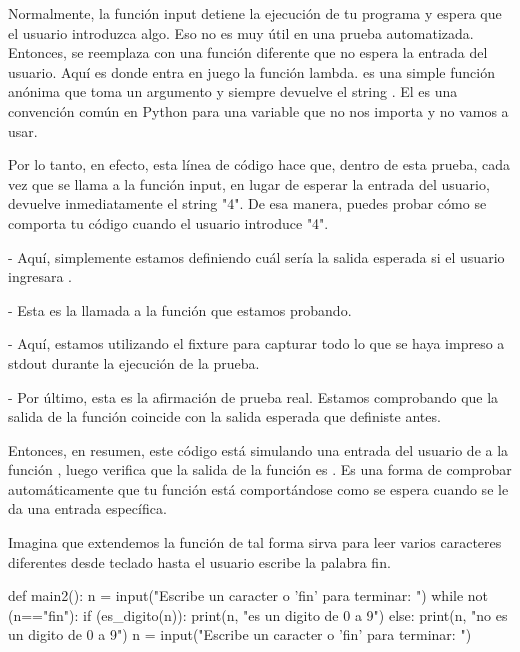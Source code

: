 Normalmente, la función input detiene la ejecución de tu programa y espera que el usuario introduzca algo. Eso no es muy útil en una prueba automatizada. Entonces, se reemplaza con una función diferente que no espera la entrada del usuario. Aquí es donde entra en juego la función lambda.  es una simple función anónima que toma un argumento \pythoninline{(_)} y siempre devuelve el string . El \pythoninline{_} es una convención común en Python para una variable que no nos importa y no vamos a usar.

Por lo tanto, en efecto, esta línea de código hace que, dentro de esta prueba, cada vez que se llama a la función input, en lugar de esperar la entrada del usuario, devuelve inmediatamente el string "4". De esa manera, puedes probar cómo se comporta tu código cuando el usuario introduce "4".

 - Aquí, simplemente estamos definiendo cuál sería la salida esperada si el usuario ingresara .

 - Esta es la llamada a la función que estamos probando.

 -  Aquí, estamos utilizando el fixture  para capturar todo lo que se haya impreso a stdout durante la ejecución de la prueba.

 - Por último, esta es la afirmación de prueba real. Estamos comprobando que la salida de la función  coincide con la salida esperada que definiste antes.

Entonces, en resumen, este código está simulando una entrada del usuario de  a la función , luego verifica que la salida de la función es . Es una forma de comprobar automáticamente que tu función está comportándose como se espera cuando se le da una entrada específica.


Imagina que extendemos la función  de tal forma sirva para leer varios caracteres diferentes desde teclado hasta el usuario escribe la palabra fin.

\begin{python}
def main2():
    n = input("Escribe un caracter o 'fin' para terminar: ")
    while not (n=="fin"):
        if (es_digito(n)):
            print(n, "es un digito de 0 a 9")
        else:
            print(n, "no es un digito de 0 a 9")
        n = input("Escribe un caracter o 'fin' para terminar: ")
\end{python}

